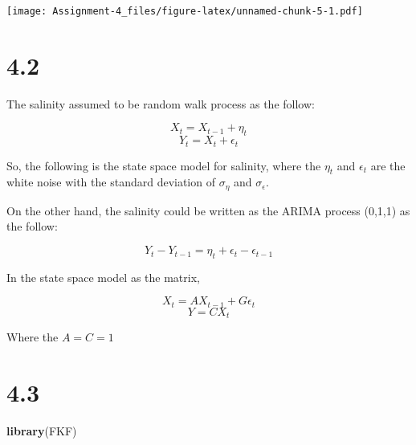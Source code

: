 \documentclass[]{article}
\newenvironment{Shaded}{\begin{snugshade}}{\end{snugshade}}
\newcommand{\DataTypeTok}[1]{\textcolor[rgb]{0.13,0.29,0.53}{#1}}
\newcommand{\KeywordTok}[1]{\textcolor[rgb]{0.13,0.29,0.53}{\textbf{#1}}}
\newcommand{\NormalTok}[1]{#1}
\newcommand{\OperatorTok}[1]{\textcolor[rgb]{0.81,0.36,0.00}{\textbf{#1}}}
\newcommand{\StringTok}[1]{\textcolor[rgb]{0.31,0.60,0.02}{#1}}
\begin{document}
\begin{Shaded}
\end{Shaded}

\texttt{[image: Assignment-4\_files/figure-latex/unnamed-chunk-5-1.pdf]}

\hypertarget{section}{%
\section{4.2}\label{section}}

The salinity assumed to be random walk process as the follow:

\[X_{t} = X_{t-1} + \eta_{t}\] \[Y_{t} = X_{t} + \epsilon_{t}\]

So, the following is the state space model for salinity, where the
\(\eta_{t}\) and \(\epsilon_{t}\) are the white noise with the standard
deviation of \(\sigma_{\eta}\) and \(\sigma_{\epsilon}\).

On the other hand, the salinity could be written as the ARIMA process
(0,1,1) as the follow:

\[Y_{t}-Y_{t-1} = \eta_{t} + \epsilon_{t}-\epsilon_{t-1}\]

In the state space model as the matrix,

\[X_t=AX_{t-1} + G\epsilon_{t}\] \[Y =CX_t\]

Where the \(A=C=1\)

\hypertarget{section-1}{%
\section{4.3}\label{section-1}}

\begin{Shaded}
\begin{Highlighting}[]
\KeywordTok{library}\NormalTok{(FKF)}
\end{Highlighting}
\end{Shaded}
\end{document}
